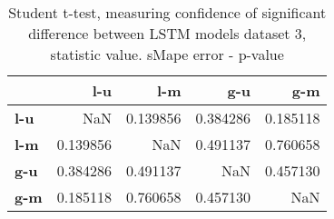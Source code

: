 \begin{table}[h]
\centering
\caption{Student t-test, measuring confidence of significant difference between LSTM models dataset 3, statistic value. sMape error - p-value}
\label{table:ttest-p-values-lstm-experiments-sMAPE-dataset-3}
\begin{tabular}{lrrrr}
\toprule
{} &       l-u &       l-m &       g-u &       g-m \\
\midrule
\textbf{l-u} &       NaN &  0.139856 &  0.384286 &  0.185118 \\
\textbf{l-m} &  0.139856 &       NaN &  0.491137 &  0.760658 \\
\textbf{g-u} &  0.384286 &  0.491137 &       NaN &  0.457130 \\
\textbf{g-m} &  0.185118 &  0.760658 &  0.457130 &       NaN \\
\bottomrule
\end{tabular}
\end{table}
